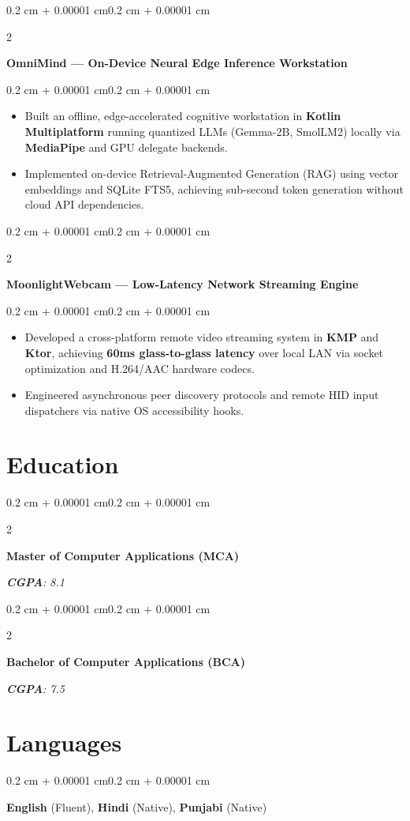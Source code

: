 \documentclass[10pt, a4paper]{article}
\newenvironment{highlights}{
    \begin{itemize}[
        topsep=0.06 cm,
        parsep=0.05 cm,
        partopsep=0pt,
        itemsep=0pt,
        leftmargin=0.4 cm + 10pt
    ]
}{
    \end{itemize}
}
\newenvironment{onecolentry}{
    \begin{adjustwidth}{0.2 cm + 0.00001 cm}{0.2 cm + 0.00001 cm}
}{
    \end{adjustwidth}
}
\newenvironment{twocolentry}[2][]{
    \onecolentry
    \def\secondColumn{#2}
    \setcolumnwidth{\fill, 4.5 cm}
    \begin{paracol}{2}
}{
    \switchcolumn \raggedleft \secondColumn
    \end{paracol}
    \endonecolentry
}
\let\hrefWithoutArrow\href
\renewcommand{\href}[2]{\hrefWithoutArrow{#1}{\ifthenelse{\equal{#2}{}}{ }{#2 }\raisebox{.15ex}{\footnotesize \faExternalLink*}}}
\begin{document}
\begin{twocolentry}{\textit{\href{https://github.com/I-am-Manu-Singh/OmniMind}{\underline{Repo}}}}
    \textbf{OmniMind — On-Device Neural Edge Inference Workstation}
\end{twocolentry}
\vspace{0.06 cm}
\begin{onecolentry}
    \begin{highlights}
    \item Built an offline, edge-accelerated cognitive workstation in \textbf{Kotlin Multiplatform} running quantized LLMs (Gemma-2B, SmolLM2) locally via \textbf{MediaPipe} and GPU delegate backends.
    \item Implemented on-device Retrieval-Augmented Generation (RAG) using vector embeddings and SQLite FTS5, achieving sub-second token generation without cloud API dependencies.
    \end{highlights}
\end{onecolentry}
\vspace{0.14 cm}

\begin{twocolentry}{\textit{\href{https://github.com/I-am-Manu-Singh/MoonlightWebcam}{\underline{Repo}}}}
    \textbf{MoonlightWebcam — Low-Latency Network Streaming Engine}
\end{twocolentry}
\vspace{0.06 cm}
\begin{onecolentry}
    \begin{highlights}
    \item Developed a cross-platform remote video streaming system in \textbf{KMP} and \textbf{Ktor}, achieving \textbf{60ms glass-to-glass latency} over local LAN via socket optimization and H.264/AAC hardware codecs.
    \item Engineered asynchronous peer discovery protocols and remote HID input dispatchers via native OS accessibility hooks.
    \end{highlights}
\end{onecolentry}

\section{Education}
\begin{twocolentry}{\textit{\textbf{CGPA}: 8.1}}
    \textbf{Master of Computer Applications (MCA)} 
\end{twocolentry}
\vspace{0.04 cm}
\begin{twocolentry}{\textit{\textbf{CGPA}: 7.5}}
    \textbf{Bachelor of Computer Applications (BCA)} 
\end{twocolentry}

\section{Languages}
\begin{onecolentry}
\textbf{English} (Fluent), \textbf{Hindi} (Native), \textbf{Punjabi} (Native)
\end{onecolentry}
\end{document}
